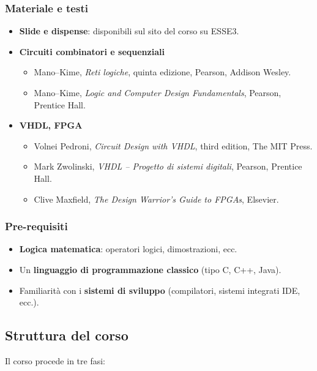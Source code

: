 \documentclass[12pt, a4paper]{article}
\begin{document}
\subsubsection{Materiale e testi}
\begin{itemize}
    \item \textbf{Slide e dispense}: disponibili sul sito del corso su ESSE3.
    \item \textbf{Circuiti combinatori e sequenziali}
    \begin{itemize}
        \item Mano--Kime, \emph{Reti logiche}, quinta edizione, Pearson, Addison Wesley.
        \item Mano--Kime, \emph{Logic and Computer Design Fundamentals}, Pearson, Prentice Hall.
    \end{itemize}
    \item \textbf{VHDL, FPGA}
    \begin{itemize}
        \item Volnei Pedroni, \emph{Circuit Design with VHDL}, third edition, The MIT Press.
        \item Mark Zwolinski, \emph{VHDL -- Progetto di sistemi digitali}, Pearson, Prentice Hall.
        \item Clive Maxfield, \emph{The Design Warrior's Guide to FPGAs}, Elsevier.
    \end{itemize}
\end{itemize}

\subsubsection{Pre-requisiti}
\begin{itemize}
    \item \textbf{Logica matematica}: operatori logici, dimostrazioni, ecc.
    \item Un \textbf{linguaggio di programmazione classico} (tipo C, C++, Java).
    \item Familiarità con i \textbf{sistemi di sviluppo} (compilatori, sistemi integrati IDE, ecc.).
\end{itemize}

\subsection{Struttura del corso}

Il corso procede in tre fasi:
\end{document}
